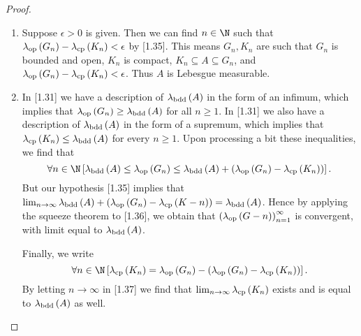 \documentclass[pmath450]{subfiles}
\begin{document}
    \begin{proof}
        \begin{enumerate}
            \item Suppose $\epsilon>0$ is given. Then we can find $n\in\N$ such that $\lambda_{\operatorname{op}}\left( G_n \right)-\lambda_{\operatorname{cp}}\left( K_n \right)<\epsilon$ by [1.35]. This means $G_n, K_n$ are such that $G_n$ is bounded and open, $K_n$ is compact, $K_n\subseteq A\subseteq G_n$, and $\lambda_{\operatorname{op}}\left( G_n \right)-\lambda_{\operatorname{cp}}\left( K_n \right)<\epsilon$. Thus $A$ is Lebesgue measurable.

            \item In [1.31] we have a description of $\lambda_{\operatorname{bdd}}\left( A \right)$ in the form of an infimum, which implies that $\lambda_{\operatorname{op}}\left( G_n \right)\geq\lambda_{\operatorname{bdd}}\left( A \right)$ for all $n\geq 1$. In [1.31] we also have a description of $\lambda_{\operatorname{bdd}}\left( A \right)$ in the form of a supremum, which implies that $\lambda_{\operatorname{cp}}\left( K_n \right)\leq\lambda_{\operatorname{bdd}}\left( A \right)$ for every $n\geq 1$. Upon processing a bit these inequalities, we find that
                \begin{equation}
                    \forall n\in\N\left[ \lambda_{\bdd}\left( A \right)\leq\lambda_{\op}\left( G_n \right)\leq\lambda_{\bdd}\left( A \right)+\left( \lambda_{\op}\left( G_n \right)-\lambda_{\cp}\left( K_n \right) \right)\right].
                \end{equation}
                But our hypothesis [1.35] implies that $\lim_{n\to\infty}\lambda_{\operatorname{bdd}}\left( A \right)+\left( \lambda_{\operatorname{op}}\left( G_n \right)-\lambda_{\operatorname{cp}}\left( K-n \right) \right)=\lambda_{\operatorname{bdd}}\left( A \right)$. Hence by applying the squeeze theorem to [1.36], we obtain that $\left( \lambda_{\operatorname{op}}\left( G-n \right) \right)^{\infty}_{n=1}$ is convergent, with limit equal to $\lambda_{\operatorname{bdd}}\left( A \right)$.

                Finally, we write
                \begin{equation}
                    \forall n\in\N\left[ \lambda_{\cp}\left( K_n \right)=\lambda_{\op}\left( G_n \right)-\left( \lambda_{\op}\left( G_n \right)-\lambda_{\cp}\left( K_n \right) \right) \right].
                \end{equation}
                By letting $n\to\infty$ in [1.37] we find that $\lim_{n\to\infty}\lambda_{\operatorname{cp}}\left( K_n \right)$ exists and is equal to $\lambda_{\operatorname{bdd}}\left( A \right)$ as well.
        \end{enumerate}
    \end{proof}
\end{document}

